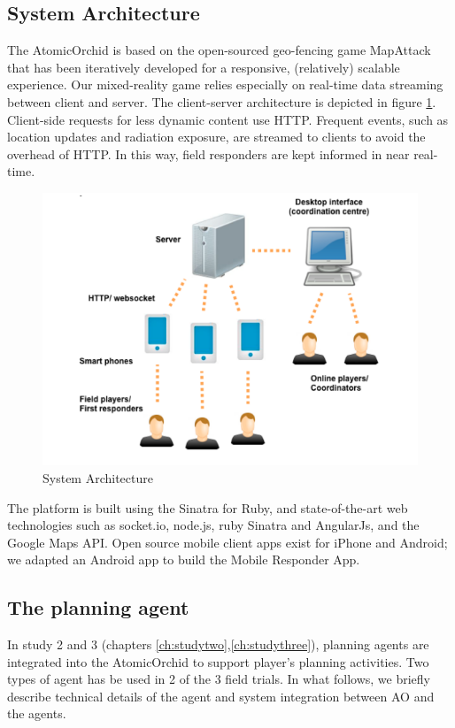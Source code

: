 \subsection{System Architecture}
The AtomicOrchid is based on the open-sourced geo-fencing game MapAttack that has been iteratively developed for a responsive, (relatively) scalable experience. Our mixed-reality game relies especially on real-time data streaming between client and server. The client-server architecture is depicted in figure \ref{fig:sysArchitecture}. Client-side requests for less dynamic content use HTTP. Frequent events, such as location updates and radiation exposure, are streamed to clients to avoid the overhead of HTTP. In this way, field responders are kept informed in near real-time.\\

\begin{figure}[h]
  \centering
  \includegraphics[width=1\textwidth]{img/approach/systemArchitecture}
  \caption{System Architecture}
  \label{fig:sysArchitecture}
\end{figure}

The platform is built using the Sinatra for Ruby, and state-of-the-art web technologies such as socket.io, node.js, ruby Sinatra and AngularJs, and the Google Maps API. Open source mobile client apps exist for iPhone and Android; we adapted an Android app to build the Mobile Responder App.\\


\subsection{The planning agent}
In study 2 and 3 (chapters \ref{ch:studytwo},\ref{ch:studythree}), planning agents are integrated into the AtomicOrchid to support player's planning activities. Two types of agent has be used in 2 of the 3 field trials. In what follows, we briefly describe technical details of the agent and system integration between \ac{AO} and the agents.  \\

